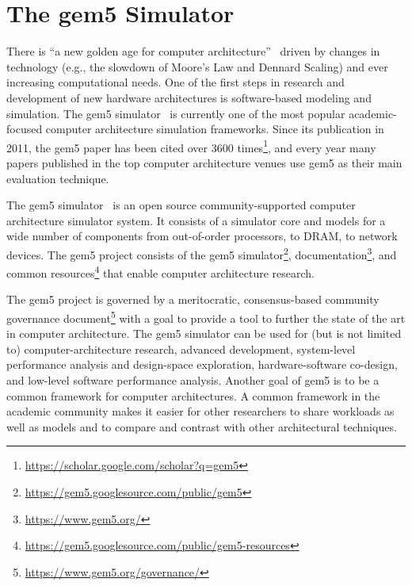 \section{The gem5 Simulator}

There is ``a new golden age for computer architecture''~\cite{turinglecture,cacm} driven by changes in technology (e.g., the slowdown of Moore's Law and Dennard Scaling) and ever increasing computational needs.
One of the first steps in research and development of new hardware architectures is software-based modeling and simulation.
The gem5 simulator~\cite{Binkert-gem5-2011} is currently one of the most popular academic-focused computer architecture simulation frameworks.
Since its publication in 2011, the gem5 paper has been cited over 3600 times\footnote{\url{https://scholar.google.com/scholar?q=gem5}}, and every year many papers published in the top computer architecture venues use gem5 as their main evaluation technique.

The gem5 simulator~\cite{Binkert-gem5-2011} is an open source community-supported computer architecture simulator system.
It consists of a simulator core and models for a wide number of components from out-of-order processors, to DRAM, to network devices.
The gem5 project consists of the gem5 simulator\footnote{\url{https://gem5.googlesource.com/public/gem5}}, documentation\footnote{\url{https://www.gem5.org/}}, and common resources\footnote{\url{https://gem5.googlesource.com/public/gem5-resources}} that enable computer architecture research.

The gem5 project is governed by a meritocratic, consensus-based community governance document\footnote{\url{https://www.gem5.org/governance/}} with a goal to provide a tool to further the state of the art in computer architecture.
The gem5 simulator can be used for (but is not limited to) computer-architecture research, advanced development, system-level performance analysis and design-space exploration, hardware-software co-design, and low-level software performance analysis.
Another goal of gem5 is to be a common framework for computer architectures.
A common framework in the academic community makes it easier for other researchers to share workloads as well as models and to compare and contrast with other architectural techniques.


